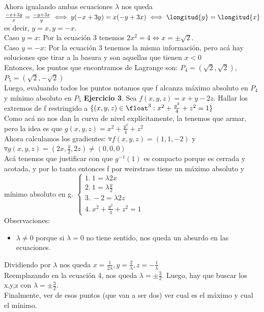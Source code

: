 \documentclass[10pt,a4paper]{article}
\begin{document}
Ahora igualando ambas ecuaciones $\lambda$ nos queda $\frac{-x+3y}{x} = \frac{-y+3x}{y} \iff y(-x+3y) = x(-y+3x) \iff \longitud{y} = \longitud{x}$ es decir, $ y = x, y = -x$. \\
Caso $y = x$: Por la ecuación 3 tenemos $2x^{2} = 4 \iff x = \pm \sqrt{2}$. \\
Caso $y = -x$: Por la ecuación 3 tenemos la misma información, pero acá hay soluciones que tirar a la basura y son aquellas que tienen $x < 0 $ \\
Entonces, los puntos que encontramos de Lagrange son: $P_{4} = (\sqrt{2}, \sqrt{2})$, $P_{5} = (\sqrt{2}, -\sqrt{2})$ \\
Luego, evaluando todos los puntos notamos que f alcanza máximo absoluto en $P_{4}$ y mínimo absoluto en $P_{5}$
\textbf{Ejercicio 3}. Sea $f(x,y,z) = x+y-2z$. Hallar los extremos de f restringido a $\{(x,y,z) \in \float^{3}: x^{2} + \frac{y^{2}}{4} + z^{2} = 1\}$ \\
Como acá no nos dan la curva de nivel explícitamente, la tenemos que armar, pero la idea es que $g(x,y,z) = x^{2} + \frac{y^{2}}{4}+z^{2}$ \\
Ahora calculamos los gradientes: $\triangledown f(x,y,z) = (1, 1, -2)$ y $\triangledown g(x,y,z) = (2x, \frac{y}{2}, 2z) \neq (0,0,0)$ \\
Acá tenemos que justificar con que $g^{-1}(1)$ es compacto porque es cerrada y acotada, y por lo tanto entonces f por weirstrass tiene un máximo absoluto y mínimo absoluto en g. 
$\begin{cases}
    1.\ 1 = \lambda 2x \\
    2.\ 1 = \lambda \frac{y}{2} \\
    3.\ -2 = \lambda 2z \\
    4.\ x^{2} + \frac{y^{2}}{4} + z^{2} = 1
\end{cases}
$ \\
Observaciones:
\begin{itemize}
    \item $\lambda \neq 0$ porque si $\lambda = 0$ no tiene sentido, nos queda un absurdo en las ecuaciones. 
\end{itemize}
Dividiendo por $\lambda$ nos queda $x = \frac{1}{2 \lambda}, y = \frac{2}{\lambda}, z = -\frac{1}{\lambda}$ \\
Reemplazando en la ecuación 4, nos queda $\lambda = \pm \frac{3}{2}$. Luego, hay que buscar los x,y,z con $\lambda = \pm \frac{3}{2}$. \\
Finalmente, ver de esos puntos (que van a ser dos) ver cual es el máximo y cual el mínimo. \\
\end{document}
